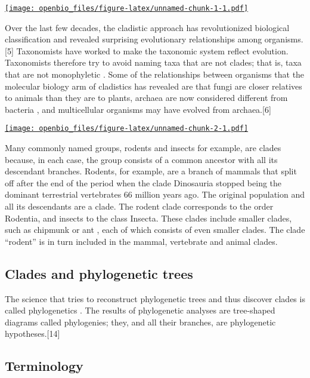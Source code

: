\documentclass[
]{book}
\begin{document}
\href{https://upload.wikimedia.org/wikipedia/commons/thumb/4/46/Clade-grade_II.svg/640px-Clade-grade_II.svg.png}{\texttt{[image: openbio\_files/figure-latex/unnamed-chunk-1-1.pdf]}}

Over the last few decades, the cladistic approach has revolutionized biological classification and revealed surprising evolutionary relationships among organisms.{[}5{]} Taxonomists have worked to make the taxonomic system reflect evolution. Taxonomists therefore try to avoid naming taxa that are not clades; that is, taxa that are not monophyletic . Some of the relationships between organisms that the molecular biology arm of cladistics has revealed are that fungi are closer relatives to animals than they are to plants, archaea are now considered different from bacteria , and multicellular organisms may have evolved from archaea.{[}6{]}

\href{https://upload.wikimedia.org/wikipedia/commons/1/11/Cladogram_Crocodilia_NL.PNG}{\texttt{[image: openbio\_files/figure-latex/unnamed-chunk-2-1.pdf]}}

Many commonly named groups, rodents and insects for example, are clades because, in each case, the group consists of a common ancestor with all its descendant branches. Rodents, for example, are a branch of mammals that split off after the end of the period when the clade Dinosauria stopped being the dominant terrestrial vertebrates 66 million years ago. The original population and all its descendants are a clade. The rodent clade corresponds to the order Rodentia, and insects to the class Insecta. These clades include smaller clades, such as chipmunk or ant , each of which consists of even smaller clades. The clade ``rodent'' is in turn included in the mammal, vertebrate and animal clades.

\hypertarget{clades-and-phylogenetic-trees}{%
\subsection{Clades and phylogenetic trees}\label{clades-and-phylogenetic-trees}}

The science that tries to reconstruct phylogenetic trees and thus discover clades is called phylogenetics . The results of phylogenetic analyses are tree-shaped diagrams called phylogenies; they, and all their branches, are phylogenetic hypotheses.{[}14{]}

\hypertarget{terminology}{%
\subsection{Terminology}\label{terminology}}
\end{document}
